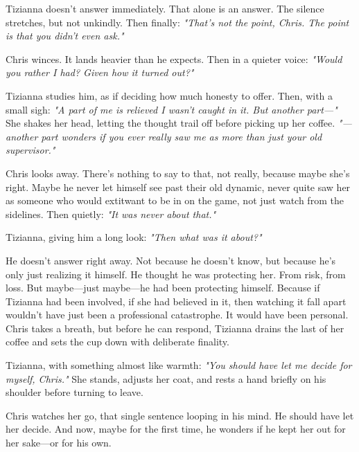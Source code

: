 \smallskip

Tizianna doesn’t answer immediately. That alone is an answer. The silence stretches, but not unkindly. Then finally: \textit{"That’s not the point, Chris. The point is that you didn’t even ask."}

\smallskip

Chris winces. It lands heavier than he expects. Then in a quieter voice: \textit{"Would you rather I had? Given how it turned out?"}

\smallskip

Tizianna studies him, as if deciding how much honesty to offer. Then, with a small sigh: \textit{"A part of me is relieved I wasn’t caught in it. But another part—"} She shakes her head, letting the thought trail off before picking up her coffee. \textit{"—another part wonders if you ever really saw me as more than just your old supervisor."}

\smallskip

Chris looks away. There’s nothing to say to that, not really, because maybe she’s right. Maybe he never let himself see past their old dynamic, never quite saw her as someone who would extit{want} to be in on the game, not just watch from the sidelines. Then quietly: \textit{"It was never about that."}

\smallskip

{Tizianna}, giving him a long look: \textit{"Then what was it about?"}

\smallskip

He doesn’t answer right away. Not because he doesn’t know, but because he’s only just realizing it himself. He thought he was protecting her. From risk, from loss. But maybe—just maybe—he had been protecting himself. Because if Tizianna had been involved, if she had believed in it, then watching it fall apart wouldn’t have just been a professional catastrophe. It would have been personal. Chris takes a breath, but before he can respond, Tizianna drains the last of her coffee and sets the cup down with deliberate finality.

\smallskip

{Tizianna}, with something almost like warmth: \textit{"You should have let me decide for myself, Chris."} She stands, adjusts her coat, and rests a hand briefly on his shoulder before turning to leave.

\smallskip

Chris watches her go, that single sentence looping in his mind. He should have let her decide. And now, maybe for the first time, he wonders if he kept her out for her sake—or for his own.

